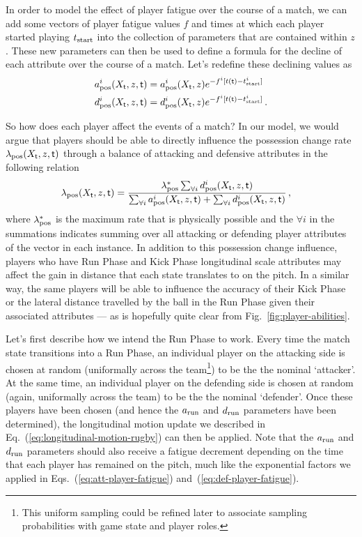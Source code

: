 In order to model the effect of player fatigue over the course of a match, we can add some vectors of player fatigue values $f$ and times at which each player started playing $t_{\rm start}$ into the collection of parameters that are contained within $z$. These new parameters can then be used to define a formula for the decline of each attribute over the course of a match. Let's redefine these declining values as
\begin{align}
a^i_{\rm pos}(X_{\sf t}, z, {\sf t}) &= a^i_{\rm pos}(X_{\sf t}, z)e^{-f^i[t({\sf t})-t^i_{\rm start}]} \label{eq:att-player-fatigue} \\
d^i_{\rm pos}(X_{\sf t}, z, {\sf t}) &= d^i_{\rm pos}(X_{\sf t}, z)e^{-f^i[t({\sf t})-t^i_{\rm start}]} \label{eq:def-player-fatigue} \,.
\end{align}

So how does each player affect the events of a match? In our model, we would argue that players should be able to directly influence the possession change rate $\lambda_{\rm pos}(X_{\sf t}, z, {\sf t})$ through a balance of attacking and defensive attributes in the following relation
\begin{align}
\lambda_{\rm pos}(X_{\sf t}, z, {\sf t}) &= \frac{\lambda^*_{\rm pos}\sum_{\forall i}d^i_{\rm pos}(X_{\sf t}, z, {\sf t})}{\sum_{\forall i}a^i_{\rm pos}(X_{\sf t}, z, {\sf t}) + \sum_{\forall i}d^i_{\rm pos}(X_{\sf t}, z, {\sf t})}\,,
\end{align}
where $\lambda^*_{\rm pos}$ is the maximum rate that is physically possible and the $\forall i$ in the summations indicates summing over all attacking or defending player attributes of the vector in each instance. In addition to this possession change influence, players who have {\sf Run Phase} and {\sf Kick Phase} longitudinal scale attributes may affect the gain in distance that each state translates to on the pitch. In a similar way, the same players will be able to influence the accuracy of their {\sf Kick Phase} or the lateral distance travelled by the ball in the {\sf Run Phase} given their associated attributes --- as is hopefully quite clear from Fig.~\ref{fig:player-abilities}. 

Let's first describe how we intend the {\sf Run Phase} to work. Every time the match state transitions into a {\sf Run Phase}, an individual player on the attacking side is chosen at random (uniformally across the team\footnote{This uniform sampling could be refined later to associate sampling probabilities with game state and player roles.}) to be the the nominal `attacker'. At the same time, an individual player on the defending side is chosen at random (again, uniformally across the team) to be the the nominal `defender'. Once these players have been chosen (and hence the $a_{\rm run}$ and $d_{\rm run}$ parameters have been determined), the longitudinal motion update we described in Eq.~(\ref{eq:longitudinal-motion-rugby}) can then be applied. Note that the $a_{\rm run}$ and $d_{\rm run}$ parameters should also receive a fatigue decrement depending on the time that each player has remained on the pitch, much like the exponential factors we applied in Eqs.~(\ref{eq:att-player-fatigue}) and~(\ref{eq:def-player-fatigue}).

